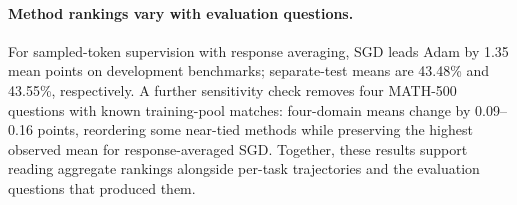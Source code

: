 \paragraph{Method rankings vary with evaluation questions.}
For sampled-token supervision with response averaging, SGD leads Adam by 1.35 mean points on development benchmarks; separate-test means are 43.48\% and 43.55\%, respectively. A further sensitivity check removes four MATH-500 questions with known training-pool matches: four-domain means change by 0.09--0.16 points, reordering some near-tied methods while preserving the highest observed mean for response-averaged SGD. Together, these results support reading aggregate rankings alongside per-task trajectories and the evaluation questions that produced them.
